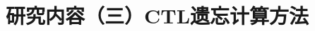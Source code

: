 \documentclass[aspectratio=1610, 9pt, CJK]{beamer}
\begin{document}
\section{研究内容（三）CTL遗忘计算方法}
\end{document}
